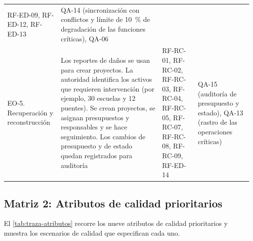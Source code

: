 \documentclass[11pt,letterpaper]{article}
\begin{document}
\begin{longtable}{L{2.4cm} L{5.0cm} L{4.2cm} L{3.9cm}}
RF-ED-09, RF-ED-12, RF-ED-13 & QA-14 (sincronización con conflictos y límite de \qty{10}{\percent}
de degradación de las funciones críticas), QA-06 \\
EO-5. Recuperación y reconstrucción & Los reportes de daños se usan para crear proyectos. La
autoridad identifica los activos que requieren intervención (por ejemplo, 30 escuelas y 12 puentes).
Se crean proyectos, se asignan presupuestos y responsables y se hace seguimiento. Los cambios de
presupuesto y de estado quedan registrados para auditoría & RF-RC-01, RF-RC-02, RF-RC-03, RF-RC-04,
RF-RC-05, RF-RC-07, RF-RC-08, RF-RC-09, RF-ED-14 & QA-15 (auditoría de presupuesto y estado), QA-13
(rastro de las operaciones críticas) \\
\end{longtable}

\subsection{Matriz 2: Atributos de calidad prioritarios}

El \cref{tab:traza-atributos} recorre los nueve atributos de calidad prioritarios y muestra los
escenarios de calidad que especifican cada uno.
\end{document}

